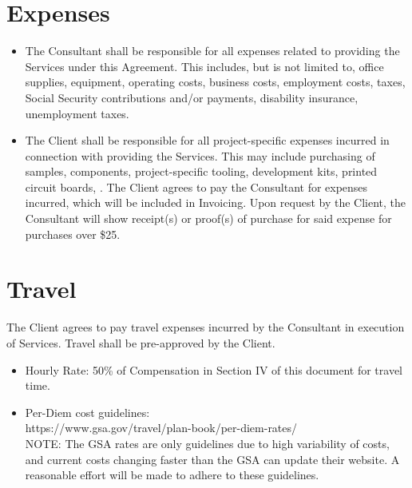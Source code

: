 \documentclass{article}
\begin{document}
\section{Expenses}
\begin{itemize}
    \item The Consultant shall be responsible for all expenses related to providing the Services under this Agreement. This includes, but is not limited to, office supplies, equipment, operating costs, business costs, employment costs, taxes, Social Security contributions and/or payments, disability insurance, unemployment taxes.
    \item The Client shall be responsible for all project-specific expenses incurred in connection with providing the Services.  This may include purchasing of samples, components, project-specific tooling, development kits, printed circuit boards, .  The Client agrees to pay the Consultant for expenses incurred, which will be included in Invoicing. Upon request by the Client, the Consultant will show receipt(s) or proof(s) of purchase for said expense for purchases over \$25. 
\end{itemize}

\section{Travel}
The Client agrees to pay travel expenses incurred by the Consultant in execution of Services.  Travel shall be pre-approved by the Client.  
\begin{itemize}
    \item Hourly Rate: 50\% of Compensation in Section IV of this document for travel time.
    \item Per-Diem cost guidelines: \\ https://www.gsa.gov/travel/plan-book/per-diem-rates/ \\ NOTE: The GSA rates are only guidelines due to high variability of costs, and current costs changing faster than the GSA can update their website.  A reasonable effort will be made to adhere to these guidelines.  
\end{itemize}
\end{document}
